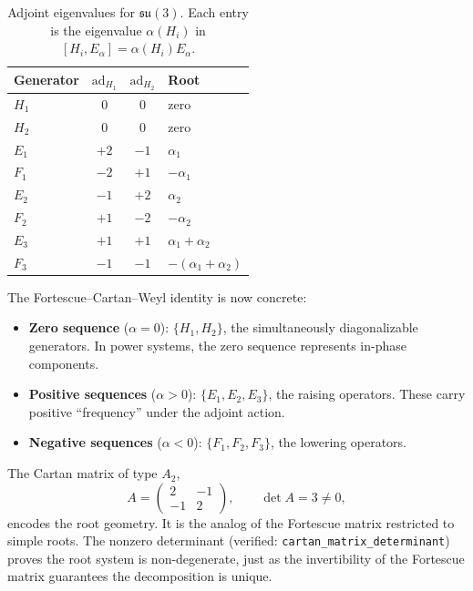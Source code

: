 \documentclass[11pt]{article}
\newcommand{\su}{\mathfrak{su}}
\newcommand{\ad}{\mathrm{ad}}
\begin{document}
\begin{table}[htbp]
\centering
\caption{Adjoint eigenvalues for $\su(3)$. Each entry is the eigenvalue
  $\alpha(H_i)$ in $[H_i, E_\alpha] = \alpha(H_i) E_\alpha$.}
\label{tab:su3-roots}
\begin{tabular}{@{}lccl@{}}
\toprule
Generator & $\ad_{H_1}$ & $\ad_{H_2}$ & Root \\
\midrule
$H_1$ & $0$ & $0$ & zero \\
$H_2$ & $0$ & $0$ & zero \\
$E_1$ & $+2$ & $-1$ & $\alpha_1$ \\
$F_1$ & $-2$ & $+1$ & $-\alpha_1$ \\
$E_2$ & $-1$ & $+2$ & $\alpha_2$ \\
$F_2$ & $+1$ & $-2$ & $-\alpha_2$ \\
$E_3$ & $+1$ & $+1$ & $\alpha_1 + \alpha_2$ \\
$F_3$ & $-1$ & $-1$ & $-(\alpha_1 + \alpha_2)$ \\
\bottomrule
\end{tabular}
\end{table}

The Fortescue--Cartan--Weyl identity is now concrete:
\begin{itemize}[leftmargin=*]
\item \textbf{Zero sequence} ($\alpha = 0$): $\{H_1, H_2\}$, the
  simultaneously diagonalizable generators. In power systems, the zero
  sequence represents in-phase components.
\item \textbf{Positive sequences} ($\alpha > 0$): $\{E_1, E_2, E_3\}$,
  the raising operators. These carry positive ``frequency'' under the
  adjoint action.
\item \textbf{Negative sequences} ($\alpha < 0$): $\{F_1, F_2, F_3\}$,
  the lowering operators.
\end{itemize}

The Cartan matrix of type $A_2$,
\begin{equation}\label{eq:cartan-matrix}
  A = \begin{pmatrix} 2 & -1 \\ -1 & 2 \end{pmatrix},
  \qquad \det A = 3 \neq 0,
\end{equation}
encodes the root geometry. It is the analog of the Fortescue matrix
restricted to simple roots. The nonzero determinant (verified:
\texttt{cartan\_matrix\_determinant}) proves the root system is
non-degenerate, just as the invertibility of the Fortescue matrix
guarantees the decomposition is unique.
\end{document}
